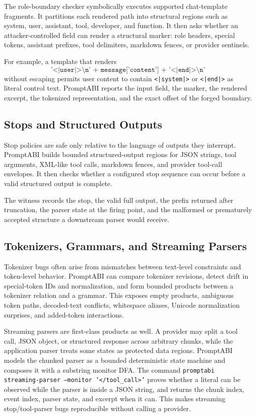 \documentclass[10pt]{article}
\begin{document}
The role-boundary checker symbolically executes supported chat-template
fragments. It partitions each rendered path into structural regions such as
system, user, assistant, tool, developer, and function. It then asks whether an
attacker-controlled field can render a structural marker: role headers, special
tokens, assistant prefixes, tool delimiters, markdown fences, or provider
sentinels.

For example, a template that renders
\[
\texttt{'<|user|>\textbackslash n' + message['content'] + '<|end|>\textbackslash n'}
\]
without escaping permits user content to contain \texttt{<|system|>} or
\texttt{<|end|>} as literal control text. PromptABI reports the input field,
the marker, the rendered excerpt, the tokenized representation, and the exact
offset of the forged boundary.

\subsection{Stops and Structured Outputs}

Stop policies are safe only relative to the language of outputs they interrupt.
PromptABI builds bounded structured-output regions for JSON strings, tool
arguments, XML-like tool calls, markdown fences, and provider tool-call
envelopes. It then checks whether a configured stop sequence can occur before a
valid structured output is complete.

The witness records the stop, the valid full output, the prefix returned after
truncation, the parser state at the firing point, and the malformed or
prematurely accepted structure a downstream parser would receive.

\subsection{Tokenizers, Grammars, and Streaming Parsers}

Tokenizer bugs often arise from mismatches between text-level constraints and
token-level behavior. PromptABI can compare tokenizer revisions, detect drift in
special-token IDs and normalization, and form bounded products between a
tokenizer relation and a grammar. This exposes empty products, ambiguous token
paths, decoded-text conflicts, whitespace aliases, Unicode normalization
surprises, and added-token interactions.

Streaming parsers are first-class products as well. A provider may split a tool
call, JSON object, or structured response across arbitrary chunks, while the
application parser treats some states as protected data regions. PromptABI models
the chunked parser as a bounded deterministic state machine and composes it with
a substring monitor DFA. The command
\texttt{promptabi streaming-parser --monitor '</tool\_call>'} proves whether a
literal can be observed while the parser is inside a JSON string, and returns the
chunk index, event index, parser state, and excerpt when it can. This makes
streaming stop/tool-parser bugs reproducible without calling a provider.
\end{document}
